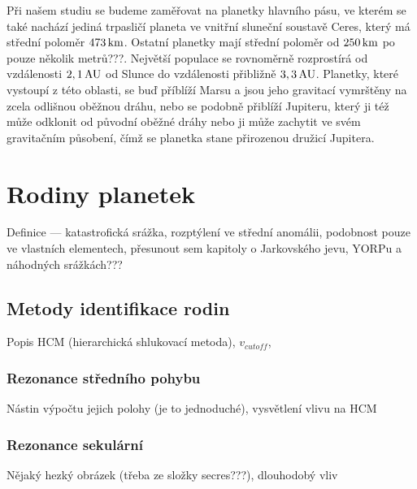 \documentclass[A4paper, 12pt, oneside]{book}
\begin{document}
Při našem studiu se budeme zaměřovat na planetky hlavního pásu, ve kterém se také nachází jediná trpasličí planeta ve vnitřní sluneční soustavě Ceres, který má střední poloměr $473\, {\rm km}$. Ostatní planetky mají střední poloměr od $250\, {\rm km}$ po pouze několik metrů???. Největší populace se rovnoměrně rozprostírá od vzdálenosti $2,1\, {\rm AU}$ od Slunce do vzdálenosti přibližně $3,3\, {\rm AU}$. Planetky, které vystoupí z této oblasti, se buď příblíží Marsu a jsou jeho gravitací vymrštěny na zcela odlišnou oběžnou dráhu, nebo se podobně přiblíží Jupiteru, který ji též může odklonit od původní oběžné dráhy nebo ji může zachytit ve svém gravitačním působení, čímž se planetka stane přirozenou družicí Jupitera. 


\section{Rodiny planetek}
Definice --- katastrofická srážka, rozptýlení ve střední anomálii, podobnost pouze ve vlastních elementech, přesunout sem kapitoly o Jarkovského jevu, YORPu a náhodných srážkách???
\subsection{Metody identifikace rodin}
Popis HCM (hierarchická shlukovací metoda), $v_{cutoff}$, 
\subsubsection{Rezonance středního pohybu}
Nástin výpočtu jejich polohy (je to jednoduché), vysvětlení vlivu na HCM
\subsubsection{Rezonance sekulární} 
Nějaký hezký obrázek (třeba ze složky secres???), dlouhodobý vliv
\end{document}
